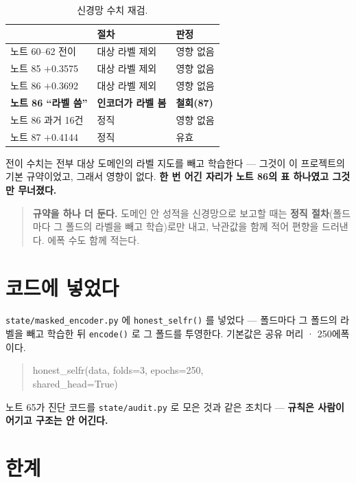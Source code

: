\documentclass[10pt]{article}
\begin{document}
\begin{table}[t]
\centering\tsize
\caption{신경망 수치 재검.}
\begin{tabular}{lll}
\toprule
& 절차 & 판정 \\
\midrule
노트 60--62 전이 & 대상 라벨 제외 & 영향 없음 \\
노트 85 $+$0.3575 & 대상 라벨 제외 & 영향 없음 \\
노트 86 $+$0.3692 & 대상 라벨 제외 & 영향 없음 \\
\textbf{노트 86 ``라벨 씀''} & \textbf{인코더가 라벨 봄} & \textbf{철회(87)} \\
노트 86 과거 16건 & 정직 & 영향 없음 \\
노트 87 $+$0.4144 & 정직 & 유효 \\
\bottomrule
\end{tabular}
\end{table}

전이 수치는 전부 대상 도메인의 라벨 지도를 빼고 학습한다 --- 그것이 이 프로젝트의
기본 규약이었고, 그래서 영향이 없다. \textbf{한 번 어긴 자리가 노트 86의 표
하나였고 그것만 무너졌다.}

\begin{quote}\fontsize{9.5}{11.5}\selectfont
\textbf{규약을 하나 더 둔다.} 도메인 안 성적을 신경망으로 보고할 때는
\textbf{정직 절차}(폴드마다 그 폴드의 라벨을 빼고 학습)로만 내고, 낙관값을 함께
적어 편향을 드러낸다. 에폭 수도 함께 적는다.
\end{quote}

\section{코드에 넣었다}

\texttt{state/masked\_encoder.py} 에 \texttt{honest\_selfr()} 를 넣었다 ---
폴드마다 그 폴드의 라벨을 빼고 학습한 뒤 \texttt{encode()} 로 그 폴드를 투영한다.
기본값은 공유 머리 · 250에폭이다.

\begin{quote}\fontsize{9.0}{11}\selectfont\ttfamily
honest\_selfr(data, folds=3, epochs=250,\\
\hspace*{2em}shared\_head=True)
\end{quote}

노트 65가 진단 코드를 \texttt{state/audit.py} 로 모은 것과 같은 조치다 ---
\textbf{규칙은 사람이 어기고 구조는 안 어긴다.}

\section{한계}
\end{document}
